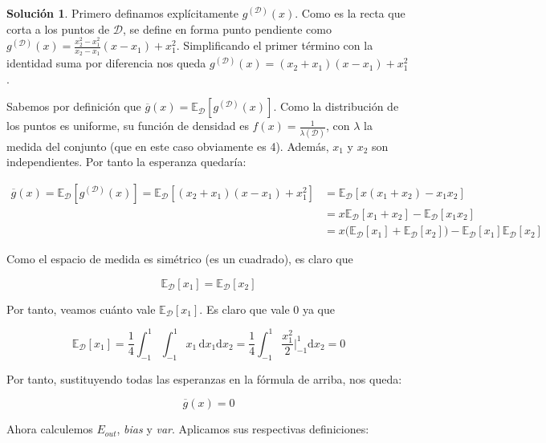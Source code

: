 \documentclass[a4paper, 11pt]{article}
\theoremstyle{definition}
\newtheorem*{solucion}{Solución}
\begin{document}
  \begin{solucion}
    Primero definamos explícitamente $g^{(\mathcal{D})}(x)$. Como es la recta que corta a los puntos de $\mathcal{D}$, se define en forma punto pendiente como $g^{(\mathcal{D})}(x) = \frac{x_2^2-x_1^2}{x_2-x_1}(x-x_1) + x_1^2$. Simplificando el primer término con la identidad suma por diferencia nos queda $g^{(\mathcal{D})}(x) = (x_2+x_1)(x-x_1) + x_1^2$.

    Sabemos por definición que $\overline{g}(x) = \mathbb{E}_\mathcal{D}\left[ g^{(\mathcal{D})}(x) \right]$. Como la distribución de los puntos es uniforme, su función de densidad es $f(x) = \frac{1}{\lambda(\mathcal{D})}$, con $\lambda$ la medida del conjunto (que en este caso obviamente es 4). Además, $x_1$ y $x_2$ son independientes. Por tanto la esperanza quedaría:


    \begin{equation*}
      \begin{split}
        \overline{g}(x) = \mathbb{E}_\mathcal{D}\left[ g^{(\mathcal{D})}(x) \right] = \mathbb{E}_\mathcal{D}\left[ (x_2+x_1)(x-x_1) + x_1^2 \right] &=            \mathbb{E}_\mathcal{D}\left[ x(x_1+x_2) - x_1x_2 \right] \\
        &= x\mathbb{E}_\mathcal{D}\left[ x_1+x_2 \right] - \mathbb{E}_\mathcal{D}\left[ x_1x_2 \right] \\
        &= x\big( \mathbb{E}_\mathcal{D}\left[ x_1 \right] + \mathbb{E}_\mathcal{D}\left[ x_2 \right] \big) - \mathbb{E}_\mathcal{D}\left[ x_1 \right] \mathbb{E}_\mathcal{D}\left[ x_2 \right]
      \end{split}
    \end{equation*}

    Como el espacio de medida es simétrico (es un cuadrado), es claro que

    $$\mathbb{E}_\mathcal{D}\left[ x_1 \right] = \mathbb{E}_\mathcal{D}\left[ x_2 \right]$$

    Por tanto, veamos cuánto vale $\mathbb{E}_\mathcal{D}\left[ x_1 \right]$. Es claro que vale 0 ya que

    $$ \mathbb{E}_\mathcal{D}\left[ x_1 \right] = \frac{1}{4}\int_{-1}^1 \int_{-1}^1 \! x_1 \, \mathrm{d}x_1 \mathrm{d}x_2 = \frac{1}{4} \int_{-1}^1 \frac{x_1^2}{2} \biggr\rvert_{-1}^1 \mathrm{d}x_2 = 0 $$

    Por tanto, sustituyendo todas las esperanzas en la fórmula de arriba, nos queda:

    $$\overline{g}(x) = 0 $$

    Ahora calculemos $E_{out}$, \emph{bias} y \emph{var}. Aplicamos sus respectivas definiciones:


\end{solucion}
\end{document}
